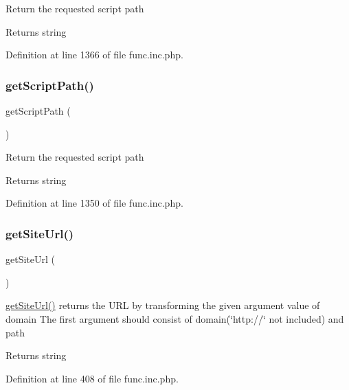 Return the requested script path

\begin{DoxyReturn}{Returns}
string 
\end{DoxyReturn}


Definition at line 1366 of file func.\+inc.\+php.

\mbox{\label{func_8inc_8php_a1086859329d03f8830d51d254c18e47e}} 
\subsubsection{\texorpdfstring{get\+Script\+Path()}{getScriptPath()}}
{\footnotesize\ttfamily get\+Script\+Path (\begin{DoxyParamCaption}{ }\end{DoxyParamCaption})}

Return the requested script path

\begin{DoxyReturn}{Returns}
string 
\end{DoxyReturn}


Definition at line 1350 of file func.\+inc.\+php.

\mbox{\label{func_8inc_8php_a2d80ea9652d1586d5dcd03d022150f73}} 
\subsubsection{\texorpdfstring{get\+Site\+Url()}{getSiteUrl()}}
{\footnotesize\ttfamily get\+Site\+Url (\begin{DoxyParamCaption}{ }\end{DoxyParamCaption})}

\hyperlink{func_8inc_8php_a2d80ea9652d1586d5dcd03d022150f73}{get\+Site\+Url()} returns the U\+RL by transforming the given argument value of domain The first argument should consist of domain(\char`\"{}http\+://\char`\"{} not included) and path

\begin{DoxyReturn}{Returns}
string 
\end{DoxyReturn}


Definition at line 408 of file func.\+inc.\+php.

